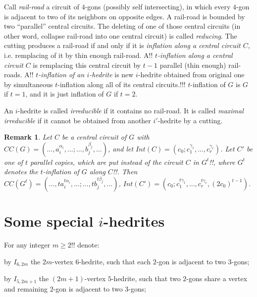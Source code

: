 \documentclass[12pt]{article}
\newtheorem{remark}{Remark}
\begin{document}
Call {\em rail-road} a circuit of $4$-gons (possibly self intersecting), 
in which every $4$-gon is adjacent to two of its neighbors on opposite
edges. A rail-road is bounded by two ``parallel'' central circuits.
The deleting of  one of those central circuits (in other word, collapse 
rail-road into one central circuit) is called {\em reducing}.
The cutting produces a rail-road if and only if it is {\em inflation 
along a central circuit $C$}, i.e. remplacing of it by thin enough 
rail-road. A!! {\em $t$-inflation along a central circuit $C$} is remplacing
this central circuit by $t-1$ parallel (thin enough) rail-roads.
A!! {\em $t$-inflation of an $i$-hedrite} is new $i$-hedrite
obtained from original one by simultaneous $t$-inflation along all
of its central circuits.!!! 
$t$-inflation of $G$ is $G$ if $t=1$, and it is just inflation of $G$ 
if $t=2$.


An $i$-hedrite is called {\em irreducible} if it contains no 
rail-road. It is called {\em maximal irreducible} if it cannot be
obtained from another $i'$-hedrite by a cutting.


\begin{remark}

Let $C$ be a central circuit of $G$ with $CC(G)=(...,a_i^{\alpha_i},...;...,b_j^{\beta_j},...)$,  and let 
$Int(C)=(c_0;c_1^{\gamma_1},...,c_r^{\gamma_r})$. Let $C'$ be one of 
$t$ parallel copies, which are put instead of the circuit $C$ in 
$G^t$!!, where $G^t$ denotes the $t$-inflation of $G$ along $C$!!.
Then $CC(G^t)=(...,ta_i^{t\alpha_i},...;...,tb_j^{t\beta_j},...)$,
$Int(C')=(c_0;c_1^{t\gamma_1},...,c_r^{t\gamma_r}, (2c_0)^{t-1})$.
\end{remark}


\section{Some special $i$-hedrites}
For any integer $m \ge 2!!$ denote:

by $I_{6,2m}$ the $2m$-vertex $6$-hedrite, such that each $2$-gon is adjacent to two $3$-gons;

by $I_{5,2m+1}$ the $(2m+1)$-vertex $5$-hedrite, such that 
two $2$-gons share a vertex and remaining $2$-gon is adjacent
to two $3$-gons;
\end{document}
